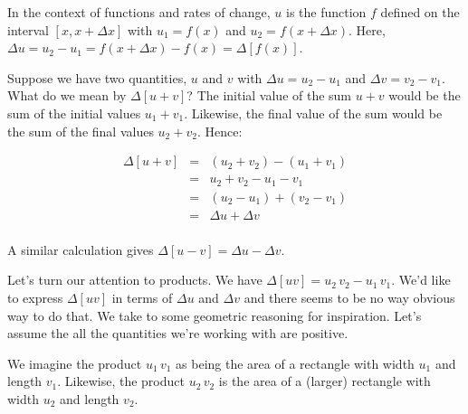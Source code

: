 \documentclass{ximera}
\begin{document}
\medskip

 In the context of functions and rates of change, $u$ is the function $f$ defined on the interval $[x, x + \Delta x]$ with $u_{1} = f(x)$ and $u_{2} = f(x+\Delta x)$.  Here, $\Delta u = u_{2} - u_{1} = f(x+\Delta x) - f(x) = \Delta[f(x)]$.  
 
\medskip

Suppose we have two quantities, $u$ and $v$ with $\Delta u = u_{2} - u_{1}$ and $\Delta v = v_{2} - v_{1}$.   What do we mean by   $\Delta[u+v]$?  The initial value of the sum $u+v$ would be the sum of the initial values $u_{1} + v_{1}$. Likewise, the final value of the sum would be the sum of the final values $u_{2} + v_{2}$.  Hence:
 
\[ \begin{array}{rcl}

 \Delta[u+v] & = & (u_{2} + v_{2}) - (u_{1} + v_{1})   \\[8pt]
                                & = &   u_{2} + v_{2} - u_{1} - v_{1} \\[8pt]
                                & = &  (u_{2} - u_{1}) + (v_{2} - v_{1}) \\[8pt]
                                & = &  \Delta u + \Delta v  \\ \end{array} \]

A similar calculation gives $\Delta[u - v] = \Delta u - \Delta v$.

\medskip

Let's turn our attention to products. We have $\Delta[uv] = u_{2} \, v_{2} - u_{1} \, v_{1}$.  We'd like to express $\Delta[uv]$ in terms of $\Delta u$ and $\Delta v$ and there seems to be no way obvious way to do that.  We take to some geometric reasoning for inspiration.  Let's assume the all the quantities we're working with are positive.
\medskip

We imagine the product $u_{1} \, v_{1}$ as being the area of a rectangle with width $u_{1}$ and length $v_{1}$.  Likewise, the product $u_{2} \, v_{2}$ is the area of a (larger) rectangle with width $u_{2}$ and length $v_{2}$.

\medskip
\end{document}
